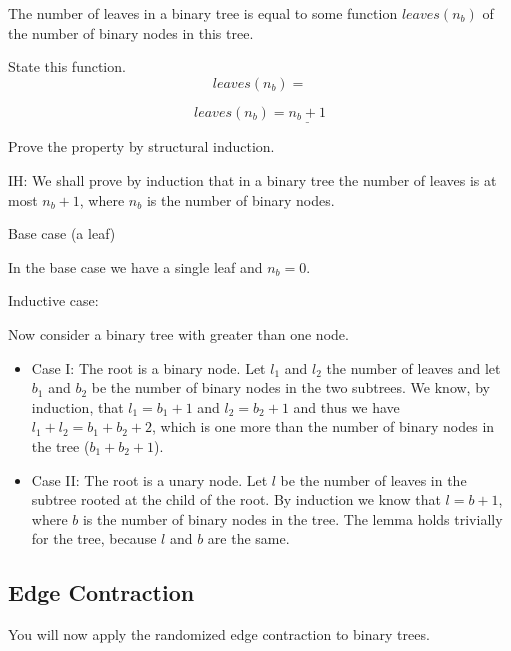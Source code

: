 \begin{problem}
The number of leaves in a binary tree  is equal to some function $\mathit{leaves}(n_b)$
of the number of binary nodes in this tree.
%

\ask[4]
State this function.
%
\[
\mathit{leaves}(n_b) = 
\]

\sol
\[
\mathit{leaves}(n_b) = \underline{n_b + 1}
\]
\end{problem}

\begin{problem}
Prove the property by structural induction.

\ask IH: 
\sol 
We shall prove by induction that in a binary tree the number of
leaves is at most $n_b + 1$, where $n_b$ is the number of binary nodes.

\ask Base case (a leaf)

\sol
In the base case we have a single leaf and $n_b = 0$.

\ask Inductive case:

\sol

Now consider a binary tree with greater than one node. 

\begin{itemize}
\item Case I:  The root is a binary node. Let $l_1$ and $l_2$ the number of leaves
and let $b_1$ and $b_2$ be the number of binary nodes in the two
subtrees.  We know, by induction, that $l_1 = b_1 + 1$ and $l_2 = b_2
+ 1$ and thus we have $l_1 + l_2 = b_1 + b_2 + 2$, which is one more
than the number of binary nodes in the tree ($b_1 + b_2 + 1$).

\item Case II: The root is a unary node.  Let $l$ be the number of
leaves in the subtree rooted at the child of the root. By induction we
know that $l = b + 1$, where $b$ is the number of binary nodes in the
tree. The lemma holds trivially for the tree, because $l$ and $b$ are
the same.
\end{itemize}
\end{problem}


\subsection{Edge Contraction}
You will now apply the randomized edge contraction to binary trees.

